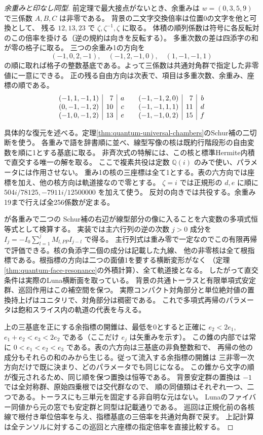 \begin{proof}[余重みと印なし同型]
前定理で最大接点がないとき、余重みは $w=(0,3,5,9)$ で三係数 $A,B,C$ は非零である。
背景の二文字交換倍率は位置0の文字を他と可換として、
残る $12,13,23$ で $\zeta,\zeta^{-1},\zeta$ に取る。
体積の順列係数は符号に各反転対のこの倍率を掛ける（逆の規約は向きを反転する）。
多重次数の差は四添字の和が零の格子に取る。
三つの余重み1の方向を
\[
 (-1,0,2,-1),\quad(-1,2,-1,0),\quad(1,-1,-1,1)
\]
の順に取れば格子の整数基底である。よって三係数は共通対角群で指定した非零値に一意にできる。
正の残る自由方向は次表で、項目は多重次数、余重み、座標の順である。
\[
\begin{array}{c|r|c@{\qquad}c|r|c}
(-1,1,-1,1)&7&a&(-1,-1,2,0)&7&b\\
(0,-1,-1,2)&10&c&(-1,-1,1,1)&11&d\\
(-1,0,-1,2)&13&e&(-1,-1,0,2)&15&f
\end{array}
\]

具体的な復元を述べる。定理\ref{thm:quantum-universal-chambers}のSchur補の二切断を使う。
各重みで語を辞書順に並べ、線型写像の核は既約行階段形の自由変数を順に1とする基底に取る。
非斉次式の特解には、この核と標準Hermite内積で直交する唯一の解を取る。
ここで複素共役は定数 $\mathbb Q(i)$ のみで使い、パラメータには作用させない。
重み1の核の三座標は全て1とする。表の六方向では座標を加え、他の核方向は軌道接なので零とする。
$\zeta=i$ では正規形の $d,e$ に順に $504i/78125,-7911i/12500000$ を加えて使う。
反対の向きでは共役する。余重み19まで行えば全256係数が定まる。

 が各重みで二つの
Schur補の右辺が線型部分の像に入ることを六変数の多項式恒等式として検算する。
実装では主六行列の逆の次数 $j>0$ 成分を $I_j=-I_0\sum_{l=1}^j M_{l,PP} I_{j-l}$ で得る。
主行列式は重み零で一定なのでこの有限再帰で評価できる。核の負添字二個の成分は記載した九線、
他の非零核は全て根指標である。根指標の方向は二つの面値1を要する横断変形がなく
（定理\ref{thm:quantum-face-resonance}の外積計算）、全て軌道接となる。
したがって直交条件は実際のLuna横断面を取っている。
背景の共通トーラスと有限単項式安定群、巡回作用はこの補空間を保つ。
実際コンパクト対角部分と単位絶対値の置換持上げはユニタリで、対角部分は稠密である。
これで多項式再帰のパラメータは飽和スライス内の軌道の代表を与える。

上の三基底を正にする余指標の開錐は、最低を0とすると正確に
$e_2<2e_1$, $e_1+e_2<e_3<2e_2$ である（ここだけ $e_j$ は矢重みを示す）。
この錐の内部では常に $0<e_1<e_2<e_3$ である。表の六方向は三基底の非負整数和で、
再帰の他の成分もそれらの和のみから生じる。従って流入する余指標の開錐は
三非零一次方向だけで既に決まり、どのパラメータでも同じになる。
この錐から文字の順が復元されるため、同じ順を保つ置換は恒等である。
背景安定群の置換は $-1$ では全対称群、原始四乗根では交代群なので、
順の同値類はそれぞれ一つ、二つである。トーラスにも三単元を固定する非自明な元はない。
Lunaのファイバー同値から元の窓でも安定群と同型は記載通りである。
巡回は正規化前の各核線で根付き単位倍率を与え、指標基底の三倍率を共通対角群で戻す。
上記計算は全テンソルに対するこの巡回と六座標の指定倍率を直接比較する。
\end{proof}

